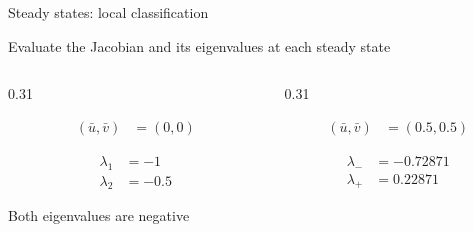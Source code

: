 \begin{frame}{Steady states: local classification}

  \vspace{-0.20cm}

  {\color{HydraMuted}\fontsize{7.7}{9.4}\selectfont
    Evaluate the Jacobian and its eigenvalues at each steady state
  \par}

  \vspace{0.10cm}

  \begin{columns}[T,onlytextwidth]

    \begin{column}{0.31\textwidth}
      \centering

      {\color{HydraWhite}\bfseries\fontsize{10.4}{13.2}\selectfont
      \begin{align*}
        (\bar u,\bar v)
        &=
        (0,0)
      \end{align*}
      }

      \vspace{-0.42cm}

      {\color{HydraWhite}\fontsize{9.1}{11.5}\selectfont
      \begin{align*}
        \lambda_1&=-1
        \\
        \lambda_2&=-0.5
      \end{align*}
      }

      \vspace{-0.34cm}

        {Both eigenvalues are negative}
    \end{column}

    \begin{column}{0.31\textwidth}
      \centering

      {\color{HydraRed}\bfseries\fontsize{10.4}{13.2}\selectfont
      \begin{align*}
        (\bar u,\bar v)
        &=
        (0.5,0.5)
      \end{align*}
      }

      \vspace{-0.42cm}

      {\color{HydraWhite}\fontsize{9.1}{11.5}\selectfont
      \begin{align*}
        \lambda_-&=-0.72871
        \\
        \lambda_+&=0.22871
      \end{align*}
      }


\end{column}
\end{columns}
\end{frame}
